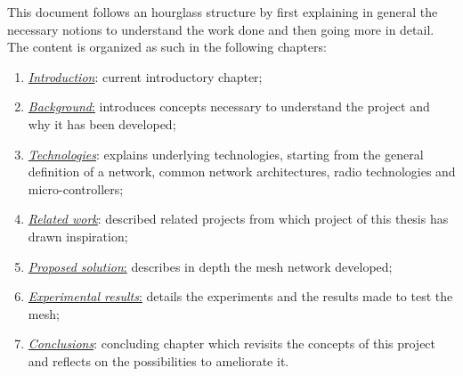 		This document follows an hourglass structure by first explaining in general the necessary notions to understand the work done and then going more in detail.
		The content is organized as such in the following chapters:
		\begin{enumerate}
			\item \hyperref[chapter:introduction]{\textit{Introduction}}: current introductory chapter;
			\item \hyperref[chapter:background]{\textit{Background}:} introduces concepts necessary to understand the project and why it has been developed;
			\item \hyperref[chapter:technologies]{\textit{Technologies}}: explains underlying technologies, starting
			from the general definition of a network, common network architectures, radio technologies and micro-controllers;
			\item \hyperref[chapter:related_work]{\textit{Related work}}: described related projects from which project of this thesis has drawn inspiration;
			\item \hyperref[chapter:proposed_solution]{\textit{Proposed solution}:} describes in depth the mesh network developed;
			\item \hyperref[chapter:results]{\textit{Experimental results}:} details the experiments and the results made to test the mesh;
			\item \hyperref[chapter:conclusions]{\textit{Conclusions}}: concluding chapter which revisits the concepts of this project and reflects on the possibilities to ameliorate it.
			
		\end{enumerate}